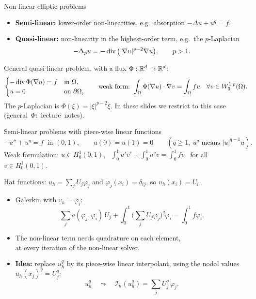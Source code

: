 \begin{frame}{Non-linear elliptic problems}
  \begin{itemize}
    \item \textbf{Semi-linear:} lower-order non-linearities, e.g.\ absorption $-\Delta u + u^q = f$.
    \item \textbf{Quasi-linear:} non-linearity in the highest-order term, e.g.\ the $p$-Laplacian
          \[
            -\Delta_p u = -\operatorname{div}\big(|\nabla u|^{p-2}\nabla u\big), \qquad p > 1.
          \]
  \end{itemize}
  General quasi-linear problem, with a flux $\Phi: {\mathbb R}^d \to {\mathbb R}^d$:
  \[
    \begin{cases}
      -\operatorname{div} \Phi(\nabla u) = f & \text{in } \Omega,         \\
      u = 0                      & \text{on } \partial\Omega,
    \end{cases}
    \qquad
    \text{weak form: } \int_\Omega \Phi(\nabla u)\cdot \nabla v = \int_\Omega f v \quad \forall v \in W^{1,p}_0(\Omega).
  \]
  The $p$-Laplacian is $\Phi(\xi) = |\xi|^{p-2}\xi$. In these slides we restrict to this case \mbox{(general $\Phi$: lecture notes).}
\end{frame}

\begin{frame}{Semi-linear problems with piece-wise linear functions}
  \[
    -u'' + u^q = f \ \text{ in } (0,1), \qquad u(0) = u(1) = 0
    \qquad (q \ge 1, \ u^q \text{ means } |u|^{q-1}u).
  \]
  Weak formulation: $u \in H^1_0(0,1)$, \ $\displaystyle\int_0^1 u'v' + \int_0^1 u^q v = \int_0^1 f v$ \ for all $v \in H^1_0(0,1)$.
  \smallskip

  Hat functions: $u_h = \sum_j U_j \varphi_j$ and $\varphi_j(x_i) = \delta_{ij}$, so \alert{$u_h(x_i) = U_i$}.
  \begin{itemize}
    \item Galerkin with $v_h = \varphi_i$:
          \[
            \sum_j a(\varphi_j,\varphi_i)\, U_j + \int_0^1 \Big(\sum_j U_j\varphi_j\Big)^q \varphi_i = \int_0^1 f\varphi_i .
          \]
    \item The non-linear term needs quadrature on each element,\\ at every iteration of the non-linear solver.
    \item \textbf{Idea:} replace $u_h^q$ by its piece-wise linear interpolant, using the nodal values $u_h(x_j)^q = U_j^q$:
          \[
            u_h^q \quad\leadsto\quad \mathcal I_h(u_h^q) = \sum_j U_j^q\, \varphi_j .
          \]
  \end{itemize}
\end{frame}

